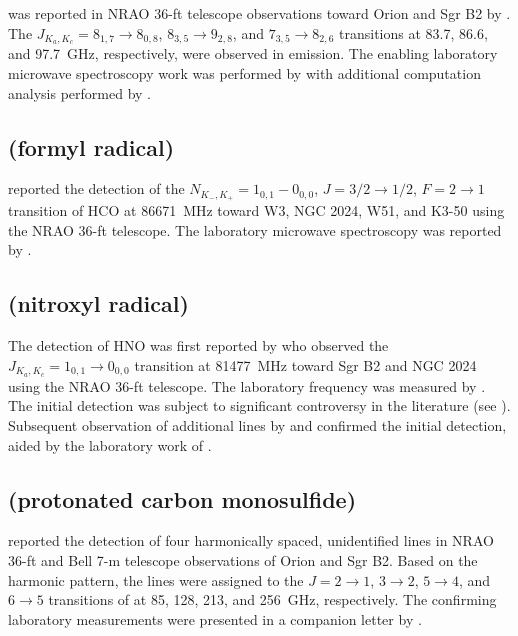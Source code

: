 \documentclass[twocolumn]{aastex631}
\begin{document}
     was reported in NRAO 36-ft telescope observations toward Orion and Sgr B2 by \citet{Snyder:1975cr}.  The $J_{K_a,K_c} = 8_{1,7}\rightarrow8_{0,8}$, $8_{3,5}\rightarrow9_{2,8}$, and $7_{3,5}\rightarrow8_{2,6}$ transitions at 83.7, 86.6, and 97.7~GHz, respectively, were observed in emission.  The enabling laboratory microwave spectroscopy work was performed by \citet{Steenbeckeliers:1968kj} with additional computation analysis performed by \citet{Kirchhoff:1972er}.
    
    \subsection{ (formyl radical)}
	\label{HCO}
	
	\citet{Snyder:1976hg} reported the detection of the $N_{K_-,K_+} = 1_{0,1} - 0_{0,0}$, $J = 3/2\rightarrow1/2$, $F = 2\rightarrow1$ transition of HCO at 86671~MHz toward W3, NGC 2024, W51, and K3-50 using the NRAO 36-ft telescope.  The laboratory microwave spectroscopy was reported by \citet{Saito:1972oi}.
	
	\subsection{ (nitroxyl radical)}
	\label{HNO}
	
	The detection of HNO was first reported by \citet{Ulich:1977by} who observed the $J_{K_a,K_c} = 1_{0,1}\rightarrow0_{0,0}$ transition at 81477~MHz toward Sgr B2 and NGC 2024 using the NRAO 36-ft telescope.  The laboratory frequency was measured by \citet{Saito:1973nb}.  The initial detection was subject to significant controversy in the literature (see \citealt{Snyder:1993po}).  Subsequent observation of additional lines by \citet{Hollis:1991ua} and \citet{Ziurys:1994dc} confirmed the initial detection, aided by the laboratory work of \citet{Sastry:1984jk}.
	
	\subsection{ (protonated carbon monosulfide)}
	\label{HCS+}
	
	\citet{Thaddeus:1981uy} reported the detection of four harmonically spaced, unidentified lines in NRAO 36-ft and Bell 7-m telescope observations of Orion and Sgr B2.  Based on the harmonic pattern, the lines were assigned to the $J = 2\rightarrow1$, $3\rightarrow2$, $5\rightarrow4$, and $6\rightarrow5$ transitions of  at 85, 128, 213, and 256~GHz, respectively. The confirming laboratory measurements were presented in a companion letter by \citet{Gudeman:1981fy}. 
	
\end{document}
